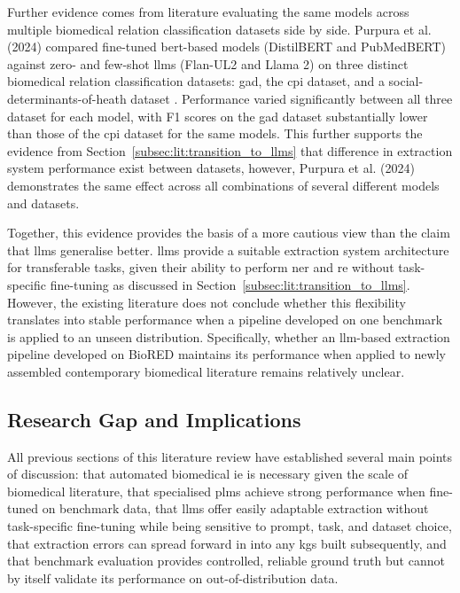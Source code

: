 Further evidence comes from literature evaluating the same models across multiple biomedical relation classification datasets side by side. Purpura et al. (2024) compared fine-tuned \gls{bert}-based models (DistilBERT and PubMedBERT) against zero- and few-shot \glspl{llm} (Flan-UL2 and Llama 2) on three distinct biomedical relation classification datasets: \gls{gad}, the \gls{cpi} dataset, and a social-determinants-of-heath dataset \cite{purpura2024investigating}. Performance varied significantly between all three dataset for each model, with F1 scores on the \gls{gad} dataset substantially lower than those of the \gls{cpi} dataset for the same models. This further supports the evidence from Section~\ref{subsec:lit:transition_to_llms} that difference in extraction system performance exist between datasets, however, Purpura et al. (2024) demonstrates the same effect across all combinations of several different models and datasets.

Together, this evidence provides the basis of a more cautious view than the claim that \glspl{llm} generalise better. \glspl{llm} provide a suitable extraction system architecture for transferable tasks, given their ability to perform \gls{ner} and \gls{re} without task-specific fine-tuning as discussed in Section~\ref{subsec:lit:transition_to_llms}. However, the existing literature does not conclude whether this flexibility translates into stable performance when a pipeline developed on one benchmark is applied to an unseen distribution. Specifically, whether an \gls{llm}-based extraction pipeline developed on BioRED maintains its performance when applied to newly assembled contemporary biomedical literature remains relatively unclear.

\subsection{Research Gap and Implications}
\label{subsec:lit:research_gap_and_implications}
All previous sections of this literature review have established several main points of discussion: that automated biomedical \gls{ie} is necessary given the scale of biomedical literature, that specialised \glspl{plm} achieve strong performance when fine-tuned on benchmark data, that \glspl{llm} offer easily adaptable extraction without task-specific fine-tuning while being sensitive to prompt, task, and dataset choice, that extraction errors can spread forward in into any \glspl{kg} built subsequently, and that benchmark evaluation provides controlled, reliable ground truth but cannot by itself validate its performance on out-of-distribution data.

